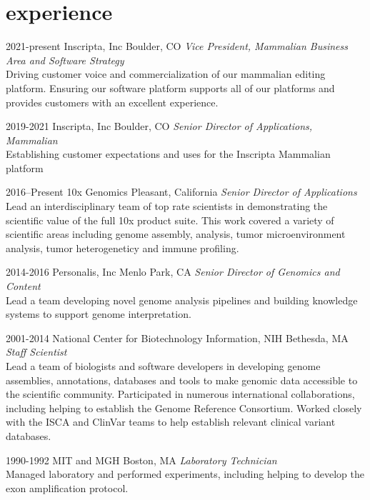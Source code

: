 \documentclass[]{dmc-cv} %
\begin{document}
\section{experience}

\begin{entrylist}


\entry
{2021-present}
{Inscripta, Inc}
{Boulder, CO}
{\emph{Vice President, Mammalian Business Area and Software Strategy} \\
Driving customer voice and commercialization of our mammalian editing platform. Ensuring our software platform supports all of our platforms and provides customers with an excellent experience.
}

\entry
{2019-2021}
{Inscripta, Inc}
{Boulder, CO}
{\emph{Senior Director of Applications, Mammalian} \\
Establishing customer expectations and uses for the Inscripta Mammalian platform
}

\entry
{2016--Present}
{10x Genomics}
{Pleasant, California}
{\emph{Senior Director of Applications} \\
Lead an interdisciplinary team of top rate scientists in demonstrating the scientific value of the full 10x product suite. This work covered a variety of scientific areas including genome assembly, analysis, tumor microenvironment analysis, tumor heterogeneticy and immune profiling.
}

\entry
{2014-2016}
{Personalis, Inc}
{Menlo Park, CA}
{\emph{Senior Director of Genomics and Content} \\
Lead a team developing novel genome analysis pipelines and building knowledge systems to support genome interpretation.
}

\entry
{2001-2014}
{National Center for Biotechnology Information, NIH}
{Bethesda, MA}
{\emph{Staff Scientist} \\
Lead a team of biologists and software developers in developing genome assemblies, annotations, databases and tools to make genomic data accessible to the scientific community. Participated in numerous international collaborations, including helping to establish the Genome Reference Consortium. Worked closely with the ISCA and ClinVar teams to help establish relevant clinical variant databases.
}

\entry
{1990-1992}
{MIT and MGH}
{Boston, MA}
{\emph{Laboratory Technician}\\
Managed laboratory and performed experiments, including helping to develop the exon amplification protocol.
}


\end{entrylist}
\end{document}
